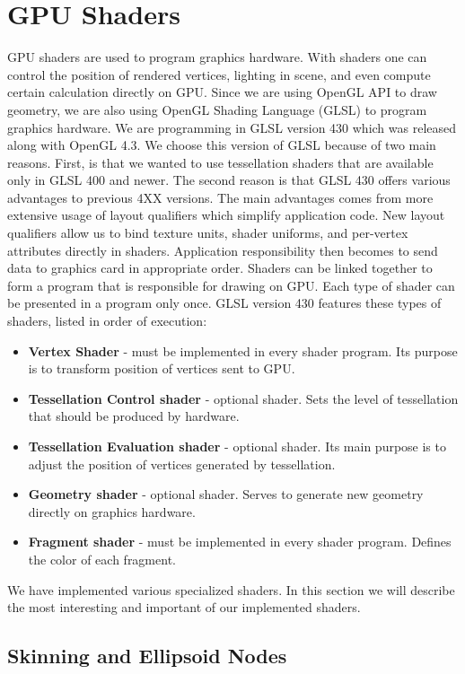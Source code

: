 \section{GPU Shaders}

GPU shaders are used to program graphics hardware.
With shaders one can control the position of rendered vertices, lighting in scene, and even compute certain calculation directly on GPU.
Since we are using OpenGL API to draw geometry, we are also using OpenGL Shading Language (GLSL) to program graphics hardware.
We are programming in GLSL version 430 which was released along with OpenGL 4.3.
We choose this version of GLSL because of two main reasons.
First, is that we wanted to use tessellation shaders that are available only in GLSL 400 and newer.
The second reason is that GLSL 430 offers various advantages to previous 4XX versions.
The main advantages comes from more extensive usage of layout qualifiers which simplify application code.
New layout qualifiers allow us to bind texture units, shader uniforms, and per-vertex attributes directly in shaders.
Application responsibility then becomes to send data to graphics card in appropriate order.
Shaders can be linked together to form a program that is responsible for drawing on GPU.
Each type of shader can be presented in a program only once.
GLSL version 430 features these types of shaders, listed in order of execution:
\pagebreak
\begin{itemize}
	\itemsep-0.25em 
	\item \textbf{Vertex Shader} - must be implemented in every shader program. Its purpose is to transform position of vertices sent to GPU.
	\item \textbf{Tessellation Control shader} - optional shader. Sets the level of tessellation that should be produced by hardware.
	\item \textbf{Tessellation Evaluation shader} - optional shader. Its main purpose is to adjust the position of vertices generated by tessellation.
	\item \textbf{Geometry shader} - optional shader. Serves to generate new geometry directly on graphics hardware.
	\item \textbf{Fragment shader} - must be implemented in every shader program. Defines the color of each fragment.
\end{itemize}
We have implemented various specialized shaders.
In this section we will describe the most interesting and important of our implemented shaders.

\subsection{Skinning and Ellipsoid Nodes}

